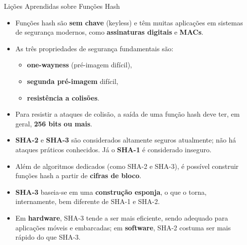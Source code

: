 \documentclass{beamer}
\begin{document}
\begin{frame}{Lições Aprendidas sobre Funções Hash}
  \begin{itemize}
    \item Funções hash são \textbf{sem chave} (keyless) e têm muitas aplicações em sistemas de segurança modernos, como \textbf{assinaturas digitais} e \textbf{MACs}.
    \item As três propriedades de segurança fundamentais são:
      \begin{itemize}
        \item \textbf{one-wayness} (pré-imagem difícil),
        \item \textbf{segunda pré-imagem} difícil,
        \item \textbf{resistência a colisões}.
      \end{itemize}
    \item Para resistir a ataques de colisão, a saída de uma função hash deve ter, em geral, \textbf{256 bits ou mais}.
    \item \textbf{SHA-2} e \textbf{SHA-3} são considerados altamente seguros atualmente; não há ataques práticos conhecidos. Já o \textbf{SHA-1} é considerado inseguro.
    \item Além de algoritmos dedicados (como SHA-2 e SHA-3), é possível construir funções hash a partir de \textbf{cifras de bloco}.
    \item \textbf{SHA-3} baseia-se em uma \textbf{construção esponja}, o que o torna, internamente, bem diferente de SHA-1 e SHA-2.
    \item Em \textbf{hardware}, SHA-3 tende a ser mais eficiente, sendo adequado para aplicações móveis e embarcadas; em \textbf{software}, SHA-2 costuma ser mais rápido do que SHA-3.
  \end{itemize}
\end{frame}
\end{document}
